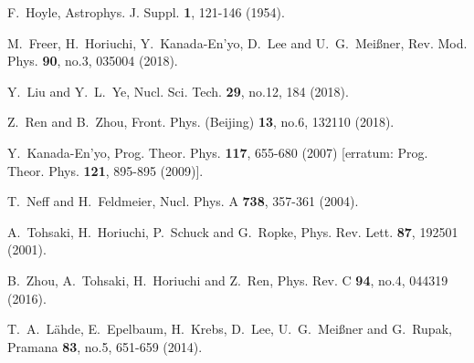 \documentclass[aps,prc,twocolumn,floatfix,12pts,superscriptaddress]{revtex4}
\begin{document}
{{\begin{thebibliography}{99}
F.~Hoyle,
Astrophys. J. Suppl. \textbf{1}, 121-146 (1954).

M.~Freer, H.~Horiuchi, Y.~Kanada-En'yo, D.~Lee and U.~G.~Mei\ss{}ner,
Rev. Mod. Phys. \textbf{90}, no.3, 035004 (2018).

Y.~Liu and Y.~L.~Ye,
Nucl. Sci. Tech. \textbf{29}, no.12, 184 (2018).

Z.~Ren and B.~Zhou,
Front. Phys. (Beijing) \textbf{13}, no.6, 132110 (2018).

Y.~Kanada-En'yo,
Prog. Theor. Phys. \textbf{117}, 655-680 (2007)
[erratum: Prog. Theor. Phys. \textbf{121}, 895-895 (2009)].

T.~Neff and H.~Feldmeier,
Nucl. Phys. A \textbf{738}, 357-361 (2004).

A.~Tohsaki, H.~Horiuchi, P.~Schuck and G.~Ropke,
Phys. Rev. Lett. \textbf{87}, 192501 (2001).

B.~Zhou, A.~Tohsaki, H.~Horiuchi and Z.~Ren,
Phys. Rev. C \textbf{94}, no.4, 044319 (2016).

T.~A.~L\"ahde, E.~Epelbaum, H.~Krebs, D.~Lee, U.~G.~Mei\ss{}ner and G.~Rupak,
Pramana \textbf{83}, no.5, 651-659 (2014).



\end{thebibliography}}}
\end{document}
